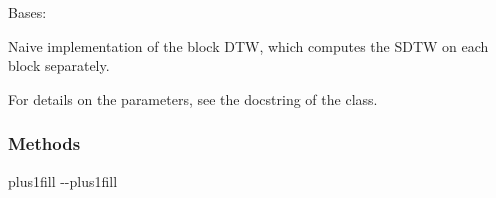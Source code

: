\documentclass[letterpaper,10pt,english]{sphinxmanual}
\begin{document}
\begin{fulllineitems}
\label{\detokenize{dtw_loss_functions.block_dtw:dtw_loss_functions.block_dtw.block_dtw_naive}}
\pysigstartsignatures
\pysiglinewithargsret
{}
{\sphinxparamcomma {}\sphinxparamcomma {}\sphinxparamcomma {}\sphinxparamcomma {}\sphinxparamcomma {}\sphinxparamcomma {}\sphinxparamcomma {}}
{}
\pysigstopsignatures
\sphinxAtStartPar
Bases: {\hyperref[\detokenize{dtw_loss_functions.soft_dtw:dtw_loss_functions.soft_dtw.soft_dtw}]{}}

\sphinxAtStartPar
Naive implementation of the block DTW, which computes the SDTW on each block separately.

\sphinxAtStartPar
For details on the parameters, see the docstring of the {\hyperref[\detokenize{dtw_loss_functions.block_dtw:dtw_loss_functions.block_dtw.block_dtw}]{}} class.
\subsubsection*{Methods}


\begin{savenotes}
\sphinxatlongtablestart
\sphinxthistablewithglobalstyle
\sphinxthistablewithnovlinesstyle
\makeatletter
  \LTleft \@totalleftmargin plus1fill
  \LTright\dimexpr\columnwidth-\@totalleftmargin-\linewidth\relax plus1fill
\makeatother
\begin{longtable}{}
\sphinxtoprule
\endfirsthead


\end{longtable}
\end{savenotes}
\end{fulllineitems}
\end{document}
